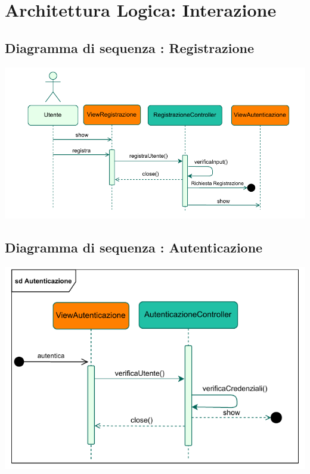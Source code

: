 

\section*{Architettura Logica: Interazione}
\vspace{0.5cm}


\subsection*{Diagramma di sequenza : Registrazione}
\vspace{0.5cm}

\begin{adjustwidth}{-0.5cm}{0cm}
\includegraphics[scale=1]{interazione/Package-Interazione-Registrazione.drawio.pdf}
\end{adjustwidth}

\subsection*{Diagramma di sequenza : Autenticazione}
\vspace{0.5cm}

\begin{adjustwidth}{1cm}{0cm}
\includegraphics[scale=1]{interazione/Package-Interazione-Autenticazione.drawio.pdf}
\end{adjustwidth}


